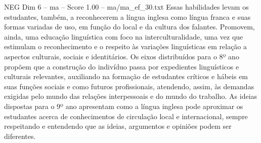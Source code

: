 \begin{textsample}{NEG Dim 6 – ma – Score 1.00 – ma/ma\_ef\_30.txt}
Essas habilidades levam os estudantes, também, a reconhecerem a língua inglesa como língua franca e suas formas variadas de uso, em função do local e da cultura dos falantes.
Promovem, ainda, uma educação linguística com foco na interculturalidade, uma vez que estimulam o reconhecimento e o respeito às variações linguísticas em relação a aspectos culturais, sociais e identitários.
Os eixos distribuídos para o 8º ano propõem que a construção do indivíduo passa por expedientes linguísticos e culturais relevantes, auxiliando na formação de estudantes críticos e hábeis em suas funções sociais e como futuros profissionais, atendendo, assim, às demandas exigidas pelo mundo das relações interpessoais e do mundo do trabalho.
As ideias dispostas para o 9º ano apresentam como a língua inglesa pode aproximar os estudantes acerca de conhecimentos de circulação local e internacional, sempre respeitando e entendendo que as ideias, argumentos e opiniões podem ser diferentes.

\end{textsample}
